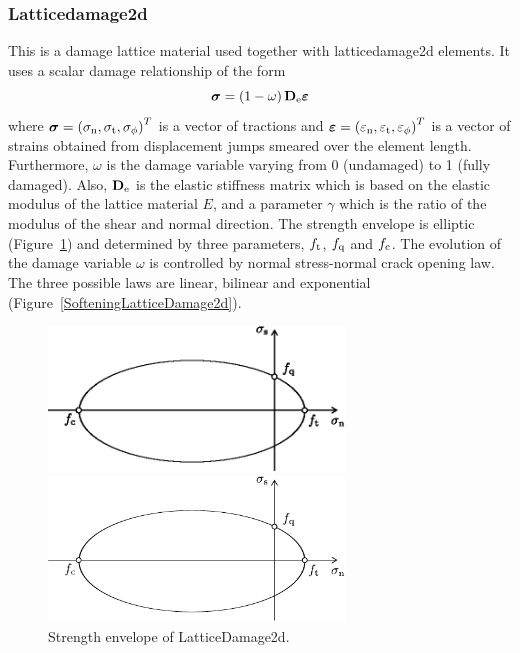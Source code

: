 \documentclass[a4paper]{article}
\begin{document}
\subsubsection{Latticedamage2d}
This is a damage lattice material used together with latticedamage2d elements.
It uses a scalar damage relationship of the form
\begin{equation}
\boldsymbol{\sigma} = \left(1-\omega\right) \mathbf{D}_{\rm e} \boldsymbol{\varepsilon}
\end{equation}
where $\boldsymbol{\sigma} = \left( \sigma_{\rm n}, \sigma_{\rm t}, \sigma_{\rm \phi}\right)^{T}$ is a vector of tractions and $\boldsymbol{\varepsilon} = \left( \varepsilon_{\rm n}, \varepsilon_{\rm t}, \varepsilon_{\rm \phi}\right)^{T}$ is a vector of strains obtained from displacement jumps smeared over the element length.
Furthermore, $\omega$ is the damage variable varying from 0 (undamaged) to 1 (fully damaged). 
Also, $\mathbf{D}_{\rm e}$ is the elastic stiffness matrix which is based on the elastic modulus of the lattice material $E$, and a parameter $\gamma$ which is the ratio of the modulus of the shear and normal direction.
The strength envelope is elliptic (Figure~\ref{StrengthLatticeDamage2d}) and determined by three  parameters, $f_{\rm t}$, $f_{\rm q}$ and $f_{\rm c}$. The evolution of the damage variable $\omega$ is controlled by normal stress-normal crack opening law. The three possible laws are linear, bilinear and exponential (Figure~\ref{SofteningLatticeDamage2d}).

\begin{figure}[!htb]
\begin{htmlonly}
  \centerline{\includegraphics[width=0.7\textwidth]{figStrengthLatticeDamage2d.eps}}
\end{htmlonly}
 \centerline{\includegraphics[width=0.7\textwidth]{figStrengthLatticeDamage2d}}
  \caption{Strength envelope of LatticeDamage2d.}
  \label{StrengthLatticeDamage2d}
\end{figure}
\end{document}
